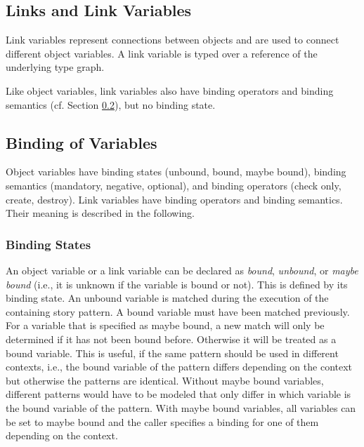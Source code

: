 \subsection{Links and Link Variables}
\label{sec:StoryPatterns:links}

Link variables represent connections between objects and are used to connect
different object variables.
A link variable is typed over a reference of the underlying type graph.

Like object variables, link variables also have binding
operators and binding semantics (cf. Section \ref{sec:StoryPatterns:binding}), but no binding state.




\subsection{Binding of Variables}
\label{sec:StoryPatterns:binding}

Object variables have binding states (unbound, bound, maybe
bound), binding semantics (mandatory, negative, optional), and binding operators
(check only, create, destroy). Link variables have binding
operators and binding semantics.
Their meaning is described in the following. 


\subsubsection{Binding States}
\label{sec:StoryPatterns:binding:states}

An object variable or a link variable can be declared as \emph{bound}, \emph{unbound}, or
\emph{maybe bound} (i.e., it is unknown if the variable is bound or not). This is
defined by its binding state. An unbound variable is matched during the
execution of the containing story pattern. 
A bound variable must have been matched previously. 
For a variable that is specified as maybe bound, a new match will only be
determined if it has not been bound before. 
Otherwise it will be treated as a bound variable.
This is useful, if the same pattern should be used in different contexts, i.e., the bound variable of the pattern differs depending on the context but otherwise the patterns are identical.
Without maybe bound variables, different patterns would have to be modeled that only differ in which variable is the bound variable of the pattern.
With maybe bound variables, all variables can be set to maybe bound and the caller specifies a binding for one of them depending on the context.

